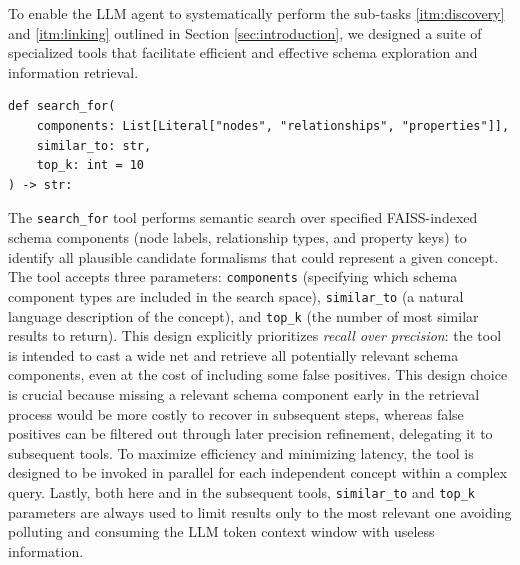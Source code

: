 To enable the LLM agent to systematically perform the sub-tasks \ref{itm:discovery} and \ref{itm:linking} outlined in Section \ref{sec:introduction}, we designed a suite of specialized tools that facilitate efficient and effective schema exploration and information retrieval.%
%
\begin{verbatim}
def search_for(
    components: List[Literal["nodes", "relationships", "properties"]],
    similar_to: str,
    top_k: int = 10
) -> str:
\end{verbatim}
%
The \verb|search_for| tool performs semantic search over specified FAISS-indexed schema components (node labels, relationship types, and property keys) to identify all plausible candidate formalisms that could represent a given concept. The tool accepts three parameters: \verb|components| (specifying which schema component types are included in the search space), \verb|similar_to| (a natural language description of the concept), and \verb|top_k| (the number of most similar results to return). This design explicitly prioritizes \textit{recall over precision}: the tool is intended to cast a wide net and retrieve all potentially relevant schema components, even at the cost of including some false positives. This design choice is crucial because missing a relevant schema component early in the retrieval process would be more costly to recover in subsequent steps, whereas false positives can be filtered out through later precision refinement, delegating it to subsequent tools. To maximize efficiency and minimizing latency, the tool is designed to be invoked in parallel for each independent concept within a complex query. Lastly, both here and in the subsequent tools, \verb|similar_to| and \verb|top_k| parameters are always used to limit results only to the most relevant one avoiding polluting and consuming the LLM token context window with useless information.%
%
